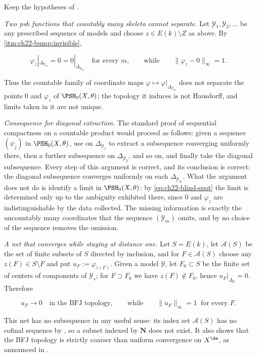 \begin{example}
\label{ex:ch22-countable-blind-spot}
Keep the hypotheses of .

\emph{Two psh functions that countably many skeleta cannot separate.}  Let
$\mathcal Y_1,\mathcal Y_2,\ldots$ be any prescribed sequence of models
and choose $z\in E(k)\setminus Z$ as above.  By
\,\cref{itm:ch22-bump:invisible},

\[
 \varphi_z|_{\Delta_{\mathcal Y_m}}=0=0|_{\Delta_{\mathcal Y_m}}
 \quad\text{for every }m,
 \qquad\text{while}\qquad
 \|\varphi_z-0\|_{\infty}=1 .
\tag{22.70}\label{eq:ch22-blind-spot}
\]

Thus the countable family of coordinate maps
$\varphi\mapsto\varphi|_{\Delta_{\mathcal Y_m}}$ does not separate the
points $0$ and $\varphi_z$ of $\PSH_0(X,\theta)$; the topology it
induces is not Hausdorff, and limits taken in it are not unique.

\emph{Consequence for diagonal extraction.}  The standard proof of
sequential compactness on a countable product would proceed as follows:
given a sequence $(\psi_j)$ in $\PSH_0(X,\theta)$, use
 on $\Delta_{\mathcal Y_1}$ to extract a
subsequence converging uniformly there, then a further subsequence on
$\Delta_{\mathcal Y_2}$, and so on, and finally take the diagonal
subsequence.  Every step of this argument is correct, and its conclusion is
correct: the diagonal subsequence converges uniformly on each
$\Delta_{\mathcal Y_m}$.  What the argument does not do is identify a
limit in $\PSH_0(X,\theta)$: by \eqref{eq:ch22-blind-spot} the limit is
determined only up to the ambiguity exhibited there, since $0$ and
$\varphi_z$ are indistinguishable by the data collected.  The missing
information is exactly the uncountably many coordinates that the sequence
$(\mathcal Y_m)$ omits, and by
 no choice of the sequence removes the
omission.

\emph{A net that converges while staying at distance one.}  Let $S=E(k)$,
let $\mathcal A(S)$ be the set of finite subsets of $S$ directed by
inclusion, and for $F\in\mathcal A(S)$ choose any $z(F)\in S\setminus F$
and put $u_F:=\varphi_{z(F)}$.  Given a model $\mathcal Y$, let
$F_0\subset S$ be the finite set of centers of components of
$\mathcal Y_s$; for $F\supset F_0$ we have $z(F)\notin F_0$, hence
$u_F|_{\Delta_{\mathcal Y}}=0$.  Therefore

\[
 u_F\longrightarrow0
 \quad\text{in the BFJ topology},
 \qquad\text{while}\qquad
 \|u_F\|_\infty=1\ \text{ for every }F .
\tag{22.71}\label{eq:ch22-net-at-distance-one}
\]

This net has no subsequence in any useful sense: its index set
$\mathcal A(S)$ has no cofinal sequence by
, so a subnet indexed by $\mathbf N$ does not
exist.  It also shows that the BFJ topology is strictly coarser than
uniform convergence on $X^{\An}$, as announced in
.
\end{example}

